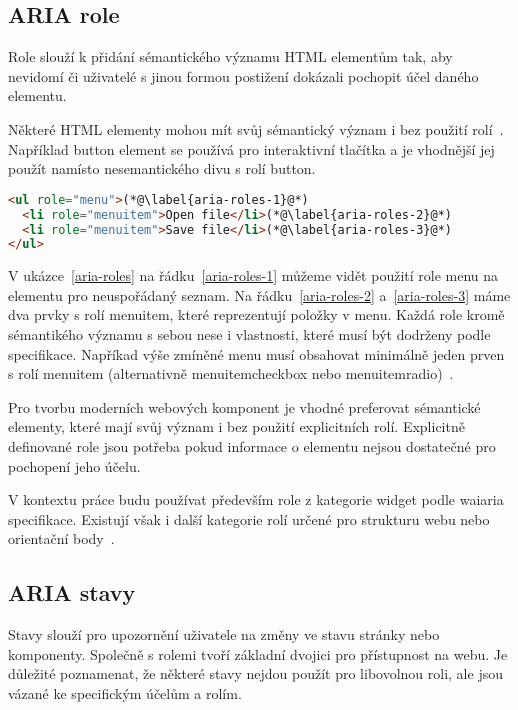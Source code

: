 \subsection{ARIA role}

Role slouží k přidání sémantického významu HTML elementům tak, aby nevidomí či uživatelé s jinou formou postižení dokázali pochopit účel daného elementu.

Některé HTML elementy mohou mít svůj sémantický význam i bez použití rolí~\cite{wai-implicit-semantics}.
Například button element se používá pro interaktivní tlačítka a je vhodnější jej použít namísto nesemantického divu s rolí button.

\begin{lstlisting}[caption={Aria role}, label={aria-roles}, language=html]
<ul role="menu">(*@\label{aria-roles-1}@*)
  <li role="menuitem">Open file</li>(*@\label{aria-roles-2}@*)
  <li role="menuitem">Save file</li>(*@\label{aria-roles-3}@*)
</ul>
\end{lstlisting}

V ukázce~\ref{aria-roles} na řádku~\ref{aria-roles-1} můžeme vidět použití role menu na elementu pro neuspořádaný seznam.
Na řádku~\ref{aria-roles-2} a~\ref{aria-roles-3} máme dva prvky s rolí menuitem, které reprezentují položky v menu.
Každá role kromě sémantikého významu s sebou nese i vlastnosti, které musí být dodrženy podle specifikace.
Napříkad výše zmíněné menu musí obsahovat minimálně jeden prven s rolí menuitem (alternativně menuitemcheckbox nebo menuitemradio)~\cite{wai-required-owned-elements,wai-standard-guidelines-required-owned-elements}.

Pro tvorbu moderních webových komponent je vhodné preferovat sémantické elementy, které mají svůj význam i bez použití explicitních rolí.
Explicitně definované role jsou potřeba pokud informace o elementu nejsou dostatečné pro pochopení jeho účelu.

V kontextu práce budu používat především role z kategorie widget podle \gls{waiaria} specifikace.
Existují však i další kategorie rolí určené pro strukturu webu nebo orientační body~\cite{wai-catorization-of-roles}.

\clearpage

\subsection{ARIA stavy}

Stavy slouží pro upozornění uživatele na změny ve stavu stránky nebo komponenty.
Společně s rolemi tvoří základní dvojici pro přístupnost na webu.
Je důležité poznamenat, že některé stavy nejdou použít pro libovolnou roli, ale jsou vázané ke specifickým účelům a rolím.

